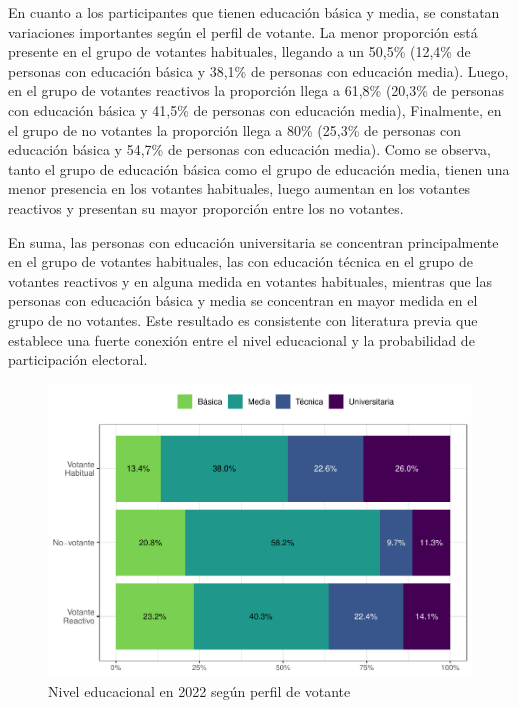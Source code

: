 \documentclass[
  12pt,
]{book}
\begin{document}
En cuanto a los participantes que tienen educación básica y media, se constatan variaciones importantes según el perfil de votante. La menor proporción está presente en el grupo de votantes habituales, llegando a un 50,5\% (12,4\% de personas con educación básica y 38,1\% de personas con educación media). Luego, en el grupo de votantes reactivos la proporción llega a 61,8\% (20,3\% de personas con educación básica y 41,5\% de personas con educación media), Finalmente, en el grupo de no votantes la proporción llega a 80\% (25,3\% de personas con educación básica y 54,7\% de personas con educación media). Como se observa, tanto el grupo de educación básica como el grupo de educación media, tienen una menor presencia en los votantes habituales, luego aumentan en los votantes reactivos y presentan su mayor proporción entre los no votantes.

En suma, las personas con educación universitaria se concentran principalmente en el grupo de votantes habituales, las con educación técnica en el grupo de votantes reactivos y en alguna medida en votantes habituales, mientras que las personas con educación básica y media se concentran en mayor medida en el grupo de no votantes. Este resultado es consistente con literatura previa que establece una fuerte conexión entre el nivel educacional y la probabilidad de participación electoral.

\begin{figure}

{\centering \includegraphics{reporte-elsoc_files/figure-latex/graf-educacion-2-1} 

}

\caption{Nivel educacional en 2022 según perfil de votante}\label{fig:graf-educacion-2}
\end{figure}
\end{document}
